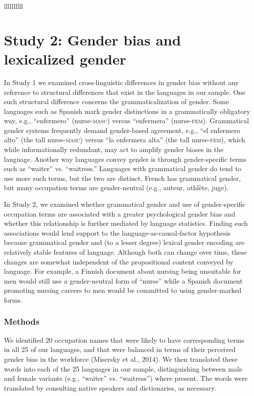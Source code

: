 \documentclass[9pt,twocolumn,twoside,lineno]{pnas-new}
\begin{document}
\begin{table}{llllllllll}
\section*{Study 2: Gender bias and lexicalized
gender}\label{study-2-gender-bias-and-lexicalized-gender}

In Study 1 we examined cross-linguistic differences in gender bias
without any reference to structural differences that exist in the
languages in our sample. One such structural difference concerns the
grammaticalization of gender. Some languages such as Spanish mark gender
distinctions in a grammatically obligatory way, e.g.,
\enquote{enfermero} (nurse-\textsc{masc}) versus \enquote{enfermera}
(nurse-\textsc{fem}). Grammatical gender systems frequently demand
gender-based agreement, e.g., \enquote{el enfermero alto} (the tall
nurse-\textsc{masc}) versus \enquote{la enfermera alta} (the tall
nurse-\textsc{fem}), which while informationally redundant, may act to
amplify gender biases in the language. Another way languages convey
gender is through gender-specific terms such as \enquote{waiter} vs.
\enquote{waitress.} Languages with grammatical gender do tend to use
more such terms, but the two are distinct. French has grammatical
gender, but many occupation terms are gender-neutral (e.g., auteur,
athlète, juge).

In Study 2, we examined whether grammatical gender and use of
gender-specific occupation terms are associated with a greater
psychological gender bias and whether this relationship is further
mediated by language statistics. Finding such associations would lend
support to the language-as-causal-factor hypothesis because grammatical
gender and (to a lesser degree) lexical gender encoding are relatively
stable features of language. Although both can change over time, these
changes are somewhat independent of the propositional content conveyed
by language. For example, a Finnish document about nursing being
unsuitable for men would still use a gender-neutral form of
\enquote{nurse} while a Spanish document promoting nursing careers to
men would be committed to using gender-marked forms.

\subsubsection*{Methods}\label{methods-2}

We identified 20 occupation names that were likely to have corresponding
terms in all 25 of our languages, and that were balanced in terms of
their perceived gender bias in the workforce (Misersky et al., 2014). We
then translated these words into each of the 25 languages in our sample,
distinguishing between male and female variants (e.g., \enquote{waiter}
vs. \enquote{waitress}) where present. The words were translated by
consulting native speakers and dictionaries, as necessary.


\end{table}
\end{document}
